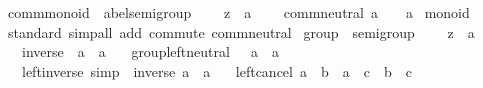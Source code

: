 \begin{isabellebody}
\isanewline
{}\isamarkupfalse%
\ comm{\isacharunderscore}{\kern0pt}monoid\ {\isacharequal}{\kern0pt}\ abel{\isacharunderscore}{\kern0pt}semigroup\ {\isacharplus}{\kern0pt}\isanewline
\ \ \ z\ {\isacharcolon}{\kern0pt}{\isacharcolon}{\kern0pt}\ {\isacharprime}{\kern0pt}a\ {\isacharparenleft}{\kern0pt}{\isachardoublequoteopen}\isanewline
\ \ \ comm{\isacharunderscore}{\kern0pt}neutral{\isacharcolon}{\kern0pt}\ {\isachardoublequoteopen}a\ \isactrlbold {\isacharasterisk}{\kern0pt}\ \ {\isacharequal}{\kern0pt}\ a{\isachardoublequoteclose}\isanewline
{}\isanewline
\isanewline
{}\isamarkupfalse%
\ monoid\isanewline
%
\isadelimproof
\ \ %
\endisadelimproof
%
\isatagproof
{}\isamarkupfalse%
\ standard\ {\isacharparenleft}{\kern0pt}simp{\isacharunderscore}{\kern0pt}all\ add{\isacharcolon}{\kern0pt}\ commute\ comm{\isacharunderscore}{\kern0pt}neutral{\isacharparenright}{\kern0pt}%
\endisatagproof
{\isafoldproof}%
%
\isadelimproof
\isanewline
%
\endisadelimproof
\isanewline
{}\isamarkupfalse%
\isanewline
\isanewline
{}\isamarkupfalse%
\ group\ {\isacharequal}{\kern0pt}\ semigroup\ {\isacharplus}{\kern0pt}\isanewline
\ \ \ z\ {\isacharcolon}{\kern0pt}{\isacharcolon}{\kern0pt}\ {\isacharprime}{\kern0pt}a\ {\isacharparenleft}{\kern0pt}{\isachardoublequoteopen}\isanewline
\ \ \ inverse\ {\isacharcolon}{\kern0pt}{\isacharcolon}{\kern0pt}\ {\isachardoublequoteopen}{\isacharprime}{\kern0pt}a\ {\isasymRightarrow}\ {\isacharprime}{\kern0pt}a{\isachardoublequoteclose}\isanewline
\ \ \ group{\isacharunderscore}{\kern0pt}left{\isacharunderscore}{\kern0pt}neutral{\isacharcolon}{\kern0pt}\ {\isachardoublequoteopen}\ \isactrlbold {\isacharasterisk}{\kern0pt}\ a\ {\isacharequal}{\kern0pt}\ a{\isachardoublequoteclose}\isanewline
\ \ \ left{\isacharunderscore}{\kern0pt}inverse\ {\isacharbrackleft}{\kern0pt}simp{\isacharbrackright}{\kern0pt}{\isacharcolon}{\kern0pt}\ \ {\isachardoublequoteopen}inverse\ a\ \isactrlbold {\isacharasterisk}{\kern0pt}\ a\ {\isacharequal}{\kern0pt}\ \isanewline
{}\isanewline
\isanewline
{}\isamarkupfalse%
\ left{\isacharunderscore}{\kern0pt}cancel{\isacharcolon}{\kern0pt}\ {\isachardoublequoteopen}a\ \isactrlbold {\isacharasterisk}{\kern0pt}\ b\ {\isacharequal}{\kern0pt}\ a\ \isactrlbold {\isacharasterisk}{\kern0pt}\ c\ {\isasymlongleftrightarrow}\ b\ {\isacharequal}{\kern0pt}\ c{\isachardoublequoteclose}\isanewline

\end{isabellebody}

